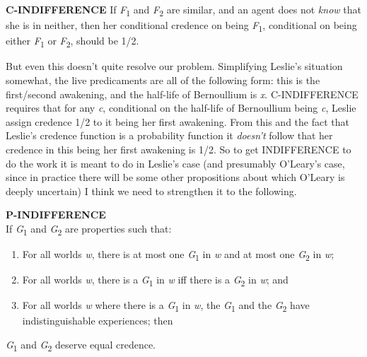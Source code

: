\documentclass[
  11pt,
  letterpaper,
  DIV=11,
  numbers=noendperiod,
  oneside]{scrartcl}
\providecommand{\tightlist}{%
  \setlength{\itemsep}{0pt}\setlength{\parskip}{0pt}}\usepackage{longtable,booktabs,array}
\begin{document}
\textbf{C-INDIFFERENCE} If \emph{F}\textsubscript{1} and
\emph{F}\textsubscript{2} are similar, and an agent does not \emph{know}
that she is in neither, then her conditional credence on being
\emph{F}\textsubscript{1}, conditional on being either
\emph{F}\textsubscript{1} or \emph{F}\textsubscript{2}, should be 1/2.

But even this doesn't quite resolve our problem. Simplifying Leslie's
situation somewhat, the live predicaments are all of the following form:
this is the first/second awakening, and the half-life of Bernoullium is
\emph{x}. C-INDIFFERENCE requires that for any \emph{c}, conditional on
the half-life of Bernoullium being \emph{c}, Leslie assign credence 1/2
to it being her first awakening. From this and the fact that Leslie's
credence function is a probability function it \emph{doesn't} follow
that her credence in this being her first awakening is 1/2. So to get
INDIFFERENCE to do the work it is meant to do in Leslie's case (and
presumably O'Leary's case, since in practice there will be some other
propositions about which O'Leary is deeply uncertain) I think we need to
strengthen it to the following.

\textbf{P-INDIFFERENCE}\\
If \emph{G}\textsubscript{1} and \emph{G}\textsubscript{2} are
properties such that:

\begin{enumerate}
\def\labelenumi{\arabic{enumi}.}
\tightlist
\item
  For all worlds \emph{w}, there is at most one
  \emph{G}\textsubscript{1} in \emph{w} and at most one
  \emph{G}\textsubscript{2} in \emph{w};
\item
  For all worlds \emph{w}, there is a \emph{G}\textsubscript{1} in
  \emph{w} iff there is a \emph{G}\textsubscript{2} in \emph{w}; and
\item
  For all worlds \emph{w} where there is a \emph{G}\textsubscript{1} in
  \emph{w}, the \emph{G}\textsubscript{1} and the
  \emph{G}\textsubscript{2} have indistinguishable experiences; then
\end{enumerate}

\emph{G}\textsubscript{1} and \emph{G}\textsubscript{2} deserve equal
credence.
\end{document}
